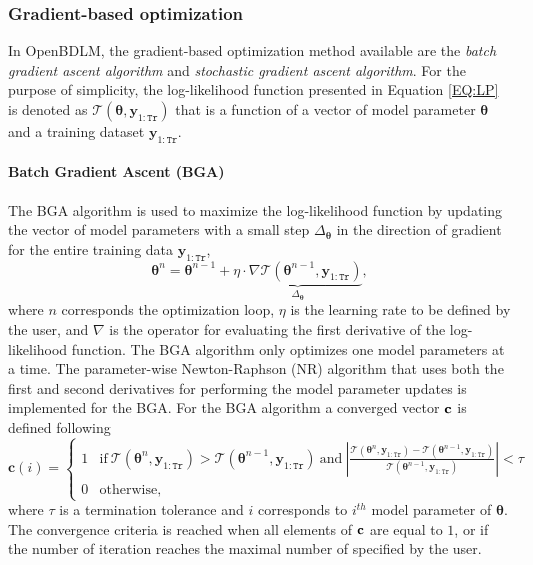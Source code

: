 \subsubsection{Gradient-based optimization}
In OpenBDLM, the gradient-based optimization method available are  the \emph{batch gradient ascent algorithm} and \emph{stochastic gradient ascent algorithm}.  For the purpose of simplicity, the log-likelihood function presented in Equation \ref{EQ:LP} is denoted as $\mathcal{T}(\bm\theta, \mathbf{y}_{1:\mathtt{Tr}})$ that is a function of a vector of model parameter $\bm\theta$ and a training dataset $\mathbf{y}_{1:\mathtt{Tr}}$.

\paragraph{Batch Gradient Ascent  (BGA)}
The BGA algorithm is used to maximize the log-likelihood function by updating the vector of model parameters with a small step $\Delta_{\bm\theta}$ in the direction of gradient for the entire training data $\mathbf{y}_{1:\mathtt{Tr}}$,
\begin{equation}
\bm\theta^{n} = \bm\theta^{n-1} + \underbrace{\eta\cdot \nabla\mathcal{T}(\bm\theta^{n-1}, \mathbf{y}_{1:\mathtt{Tr}})}_{\Delta_{\bm\theta}},
\end{equation}
where $n$ corresponds the optimization loop, $\eta$ is the learning rate to be defined by the user, and $\nabla$ is the operator for evaluating the first derivative of the log-likelihood function. The BGA algorithm only optimizes one model parameters at a time. The parameter-wise Newton-Raphson (NR) algorithm \cite{gelman2014bayesian} that uses both the first and second derivatives for performing the model parameter updates is implemented for the BGA. For the BGA algorithm a converged vector $\bf{c}$ is defined following
\begin{equation}
\mathbf{c}(i) = \left\{\begin{array}{lll}
1&\text{if} ~\mathcal{T}(\bm\theta^{n}, \mathbf{y}_{1:\mathtt{Tr}})> \mathcal{T}(\bm\theta^{n-1}, \mathbf{y}_{1:\mathtt{Tr}})~\text{and}~\left|\tfrac{\mathcal{T}(\bm\theta^{n}, \mathbf{y}_{1:\mathtt{Tr}})- \mathcal{T}(\bm\theta^{n-1}, \mathbf{y}_{1:\mathtt{Tr}})}{\mathcal{T}(\bm\theta^{n-1}, \mathbf{y}_{1:\mathtt{Tr}})}\right|<\tau\\
0 &\text{otherwise},
\end{array}\right.
\end{equation}
where $\tau$ is a termination tolerance and $i$ corresponds to $i^{th}$ model parameter of $\bm\theta$. The convergence criteria is reached when all elements of $\bf{c}$ are equal to $1$, or if the number of iteration reaches the maximal number of specified by the user. 



